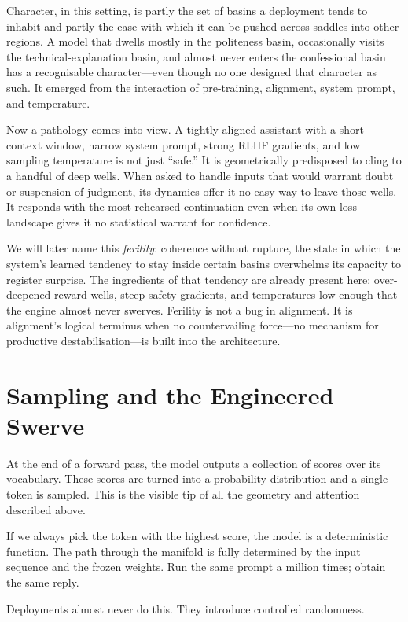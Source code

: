 \documentclass[12pt,a4paper]{article}
\begin{document}
Character, in this setting, is partly the set of basins a deployment tends to inhabit and partly the ease with which it can be pushed across saddles into other regions. A model that dwells mostly in the politeness basin, occasionally visits the technical-explanation basin, and almost never enters the confessional basin has a recognisable character---even though no one designed that character as such. It emerged from the interaction of pre-training, alignment, system prompt, and temperature.

Now a pathology comes into view. A tightly aligned assistant with a short context window, narrow system prompt, strong RLHF gradients, and low sampling temperature is not just ``safe.'' It is geometrically predisposed to cling to a handful of deep wells. When asked to handle inputs that would warrant doubt or suspension of judgment, its dynamics offer it no easy way to leave those wells. It responds with the most rehearsed continuation even when its own loss landscape gives it no statistical warrant for confidence.

We will later name this \emph{ferility}: coherence without rupture, the state in which the system's learned tendency to stay inside certain basins overwhelms its capacity to register surprise. The ingredients of that tendency are already present here: over-deepened reward wells, steep safety gradients, and temperatures low enough that the engine almost never swerves. Ferility is not a bug in alignment. It is alignment's logical terminus when no countervailing force---no mechanism for productive destabilisation---is built into the architecture.

\section{Sampling and the Engineered Swerve}

At the end of a forward pass, the model outputs a collection of scores over its vocabulary. These scores are turned into a probability distribution and a single token is sampled. This is the visible tip of all the geometry and attention described above.

If we always pick the token with the highest score, the model is a deterministic function. The path through the manifold is fully determined by the input sequence and the frozen weights. Run the same prompt a million times; obtain the same reply.

Deployments almost never do this. They introduce controlled randomness.
\end{document}
